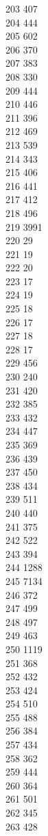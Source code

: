 { 203	407 \\
 204	444 \\
 205	602 \\
 206	370 \\
 207	383 \\
 208	330 \\
 209	444 \\
 210	446 \\
 211	396 \\
 212	469 \\
 213	539 \\
 214	343 \\
 215	406 \\
 216	441 \\
 217	412 \\
 218	496 \\
 219	3991 \\
 220	29 \\
 221	19 \\
 222	20 \\
 223	17 \\
 224	19 \\
 225	18 \\
 226	17 \\
 227	18 \\
 228	17 \\
 229	456 \\
 230	240 \\
 231	420 \\
 232	385 \\
 233	432 \\
 234	447 \\
 235	369 \\
 236	439 \\
 237	450 \\
 238	434 \\
 239	511 \\
 240	440 \\
 241	375 \\
 242	522 \\
 243	394 \\
 244	1288 \\
 245	7134 \\
 246	372 \\
 247	499 \\
 248	497 \\
 249	463 \\
 250	1119 \\
 251	368 \\
 252	432 \\
 253	424 \\
 254	510 \\
 255	488 \\
 256	384 \\
 257	434 \\
 258	362 \\
 259	444 \\
 260	364 \\
 261	501 \\
 262	345 \\
 263	428 \\
}
